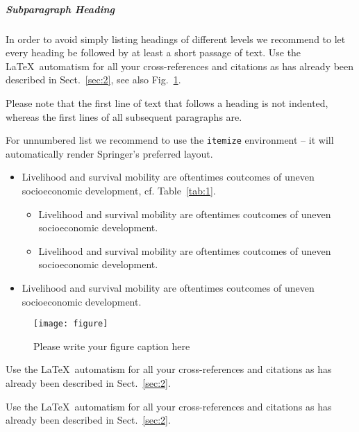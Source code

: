 \subparagraph{Subparagraph Heading} In order to avoid simply listing headings of different levels we recommend to let every heading be followed by at least a short passage of text. Use the \LaTeX\ automatism for all your cross-references and citations as has already been described in Sect.~\ref{sec:2}, see also Fig.~\ref{fig:2}.

Please note that the first line of text that follows a heading is not indented, whereas the first lines of all subsequent paragraphs are.

For unnumbered list we recommend to use the \verb|itemize| environment -- it will automatically render Springer's preferred layout.

\begin{itemize}
\item{Livelihood and survival mobility are oftentimes coutcomes of uneven socioeconomic development, cf. Table~\ref{tab:1}.}
\begin{itemize}
\item{Livelihood and survival mobility are oftentimes coutcomes of uneven socioeconomic development.}
\item{Livelihood and survival mobility are oftentimes coutcomes of uneven socioeconomic development.}
\end{itemize}
\item{Livelihood and survival mobility are oftentimes coutcomes of uneven socioeconomic development.}
\end{itemize}

\begin{figure}[t]
\sidecaption[t]
\texttt{[image: figure]}
%
%
\caption{Please write your figure caption here}
\label{fig:2}       %
\end{figure}

 Use the \LaTeX\ automatism for all your cross-references and citations as has already been described in Sect.~\ref{sec:2}.

 Use the \LaTeX\ automatism for all your cross-refer\-ences and citations as has already been described in Sect.~\ref{sec:2}.

